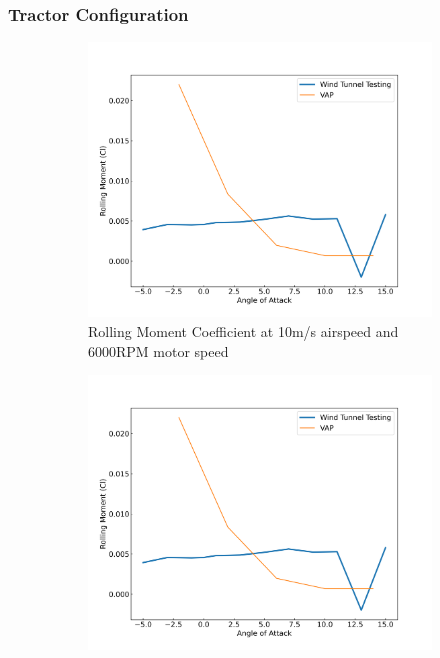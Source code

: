 \subsubsection{Tractor Configuration}



\begin{figure}[H]
    \centering
    \begin{subfigure}[b]{0.467\textwidth}
        \centering
        \includegraphics[width=\textwidth]{05_Results/VAP/tractor/Cl/10ms_6000RPM_Cl.png}
        \caption{Rolling Moment Coefficient at 10m/s airspeed and 6000RPM motor speed}
        \label{fig:VAP_Cl_10ms_6000}
    \end{subfigure}
    \begin{subfigure}[b]{0.467\textwidth}
        \centering
        \includegraphics[width=\textwidth]{05_Results/VAP/tractor/Cl/10ms_6000RPM_Cl.png}

\end{subfigure}
\end{figure}
